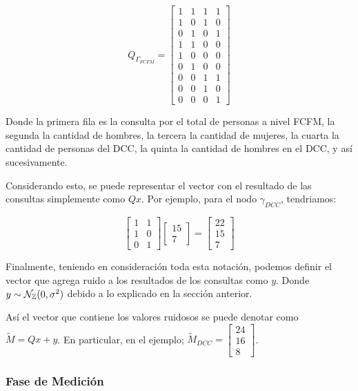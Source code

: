 \documentclass[informe]{upropuesta}
\begin{document}
$$
Q_{\Gamma_{FCFM}} = \begin{bmatrix}
    1 & 1 & 1 & 1 \\
    1 & 0 & 1 & 0 \\
    0 & 1 & 0 & 1 \\
    1 & 1 & 0 & 0 \\
    1 & 0 & 0 & 0 \\
    0 & 1 & 0 & 0 \\
    0 & 0 & 1 & 1 \\
    0 & 0 & 1 & 0 \\
    0 & 0 & 0 & 1 
\end{bmatrix}
$$

Donde la primera fila es la consulta por el total de personas a nivel FCFM, la segunda la cantidad de hombres, la tercera la cantidad de mujeres, la cuarta la cantidad de personas del DCC, la quinta la cantidad de hombres en el DCC, y así sucesivamente. 

Considerando esto, se puede representar el vector con el resultado de las consultas simplemente como $Qx$. Por ejemplo, para el nodo $\gamma_{DCC}$, tendriamos:

$$
\begin{bmatrix}
    1 & 1 \\
    1 & 0 \\
    0 & 1
\end{bmatrix}
\begin{bmatrix}
    15 \\ 
    7
\end{bmatrix}
=
\begin{bmatrix}
    22 \\
    15 \\
    7
\end{bmatrix}
$$

Finalmente, teniendo en consideración toda esta notación, podemos definir el vector que agrega ruido a los resultados de los consultas como $y$. Donde $y \sim \mathcal{N}_{\mathbb{Z}}(0, \sigma^2)$ debido a lo explicado en la sección anterior.

Así el vector que contiene los valores ruidosos se puede denotar como $\widetilde{M} = Qx + y$. En particular, en el ejemplo; $\widetilde{M}_{DCC} = 
\begin{bmatrix}
    24 \\
    16 \\
    8
\end{bmatrix}
$.

\subsubsection*{Fase de Medición}
\end{document}
